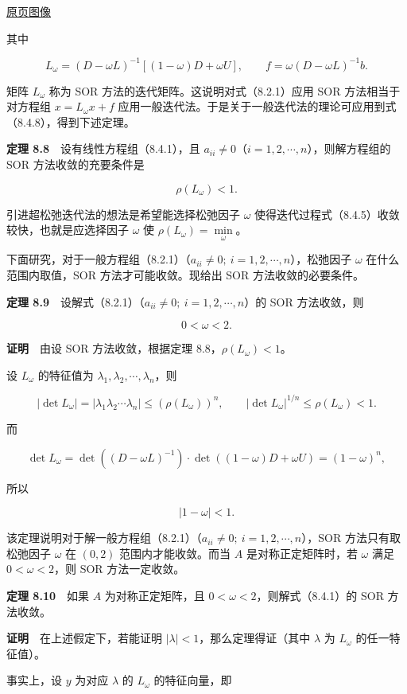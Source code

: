 \documentclass[
  10pt,
  fontset=fandol]{ctexart}
\begin{document}
\href{../../source-images/pdf-228.jpeg}{原页图像}

其中

\[
L_\omega=(D-\omega L)^{-1}[(1-\omega)D+\omega U],\qquad f=\omega(D-\omega L)^{-1}b.
\]

矩阵 \(L_\omega\) 称为 SOR 方法的迭代矩阵。这说明对式（8.2.1）应用 SOR 方法相当于对方程组 \(x=L_\omega x+f\) 应用一般迭代法。于是关于一般迭代法的理论可应用到式（8.4.8），得到下述定理。

\textbf{定理 8.8}　设有线性方程组（8.4.1），且 \(a_{ii}\neq0\)（\(i=1,2,\cdots,n\)），则解方程组的 SOR 方法收敛的充要条件是

\[
\rho(L_\omega)<1.
\]

引进超松弛迭代法的想法是希望能选择松弛因子 \(\omega\) 使得迭代过程式（8.4.5）收敛较快，也就是应选择因子 \(\omega\) 使 \(\rho(L_\omega)=\min\limits_\omega\)。

下面研究，对于一般方程组（8.2.1）（\(a_{ii}\neq0;\ i=1,2,\cdots,n\)），松弛因子 \(\omega\) 在什么范围内取值，SOR 方法才可能收敛。现给出 SOR 方法收敛的必要条件。

\textbf{定理 8.9}　设解式（8.2.1）（\(a_{ii}\neq0;\ i=1,2,\cdots,n\)）的 SOR 方法收敛，则

\[
0<\omega<2.
\]

\textbf{证明}　由设 SOR 方法收敛，根据定理 8.8，\(\rho(L_\omega)<1\)。

设 \(L_\omega\) 的特征值为 \(\lambda_1,\lambda_2,\cdots,\lambda_n\)，则

\[
|\det L_\omega|=|\lambda_1\lambda_2\cdots\lambda_n|\leqslant(\rho(L_\omega))^n,\qquad
|\det L_\omega|^{1/n}\leqslant\rho(L_\omega)<1.
\]

而

\[
\det L_\omega=\det((D-\omega L)^{-1})\cdot\det((1-\omega)D+\omega U)=(1-\omega)^n,
\]

所以

\[
|1-\omega|<1.
\]

该定理说明对于解一般方程组（8.2.1）（\(a_{ii}\neq0;\ i=1,2,\cdots,n\)），SOR 方法只有取松弛因子 \(\omega\) 在 \((0,2)\) 范围内才能收敛。而当 \(A\) 是对称正定矩阵时，若 \(\omega\) 满足 \(0<\omega<2\)，则 SOR 方法一定收敛。

\textbf{定理 8.10}　如果 \(A\) 为对称正定矩阵，且 \(0<\omega<2\)，则解式（8.4.1）的 SOR 方法收敛。

\textbf{证明}　在上述假定下，若能证明 \(|\lambda|<1\)，那么定理得证（其中 \(\lambda\) 为 \(L_\omega\) 的任一特征值）。

事实上，设 \(y\) 为对应 \(\lambda\) 的 \(L_\omega\) 的特征向量，即
\end{document}

